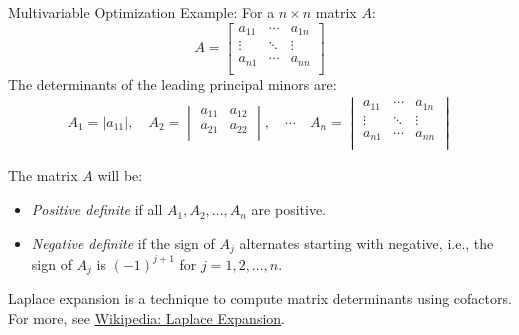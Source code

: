 \documentclass[
    NAME={Dr. Helga Ingimundardóttir},
    EMAIL={helgaingim@hi.is},
    FACULTY={Industrial Engineering},
    TITLE={Local and Global Optimization},
    SUBTITLE={Understanding Optima in Complex Landscapes},
    SEMINAR={VÉL113F},
    DATE={Design and Optimization},
    WIDE=true
]{../HI-latex/hi-beamer}
\begin{document}
\begin{frame}{Multivariable Optimization}
        \alert{Example:} For a \(n \times n\) matrix \(A\):
        \[
            A = \begin{bmatrix}
                    a_{11} & \cdots & a_{1n} \\
                    \vdots & \ddots & \vdots \\
                    a_{n1} & \cdots & a_{nn} \\
            \end{bmatrix}
        \]
        The determinants of the leading principal minors are:
        \begin{align*}
            A_1 = |a_{11}|, \quad
            A_2 = \begin{vmatrix}
                      a_{11} & a_{12} \\
                      a_{21} & a_{22} \\
            \end{vmatrix}, \quad
            \cdots \quad
            A_n = \begin{vmatrix}
                      a_{11} & \cdots & a_{1n} \\
                      \vdots & \ddots & \vdots \\
                      a_{n1} & \cdots & a_{nn} \\
            \end{vmatrix}
        \end{align*}

        The matrix \(A\) will be:
        \begin{itemize}
            \item \emph{Positive definite} if all \(A_1, A_2, \dots, A_n\) are positive.
            \item \emph{Negative definite} if the sign of \(A_j\) alternates starting with negative, i.e., the sign of \(A_j\)
            is \((-1)^{j+1}\) for \(j = 1, 2, \dots, n\).
        \end{itemize}
        \bigskip
        \alert{Laplace expansion} is a technique to compute matrix determinants using cofactors.
        For more, see \href{https://en.wikipedia.org/wiki/Laplace_expansion}{Wikipedia: Laplace Expansion}.

    \end{frame}
\end{document}
